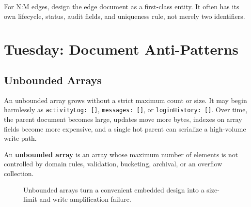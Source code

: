 \begin{tipbox}
For N:M edges, design the edge document as a first-class entity. It often has its own lifecycle, status, audit fields, and uniqueness rule, not merely two identifiers.
\end{tipbox}

\section{Tuesday: Document Anti-Patterns}
\subsection{Unbounded Arrays}
An unbounded array grows without a strict maximum count or size. It may begin harmlessly as \texttt{activityLog: []}, \texttt{messages: []}, or \texttt{loginHistory: []}. Over time, the parent document becomes large, updates move more bytes, indexes on array fields become more expensive, and a single hot parent can serialize a high-volume write path.

\begin{definitionbox}
An \textbf{unbounded array} is an array whose maximum number of elements is not controlled by domain rules, validation, bucketing, archival, or an overflow collection.
\end{definitionbox}

\begin{figure}[H]
    \centering
    \caption{Unbounded arrays turn a convenient embedded design into a size-limit and write-amplification failure.}
    \label{fig:ch3-unbounded-array-pitfall}
\end{figure}

